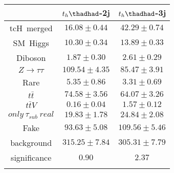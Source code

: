 \centering
\begin{tabular}{|ccc} \toprule\toprule
 & $t_{h}\thadhad$-2j & $t_{h}\thadhad$-3j\\\midrule
tcH~merged & $16.08\pm0.44$ & $42.29\pm0.74$\\
SM~Higgs & $10.30\pm0.34$ & $13.89\pm0.33$\\
Diboson & $1.87\pm0.30$ & $2.61\pm0.29$\\
$Z\to\tau\tau$ & $109.54\pm4.35$ & $85.47\pm3.91$\\
Rare & $5.35\pm0.86$ & $3.31\pm0.69$\\
$t\bar{t}$ & $74.58\pm3.56$ & $64.07\pm3.26$\\
$t\bar{t}V$ & $0.16\pm0.04$ & $1.57\pm0.12$\\
$only~\tau_{sub}~real$ & $19.83\pm1.78$ & $24.84\pm2.08$\\
Fake & $93.63\pm5.08$ & $109.56\pm5.46$\\
background & $315.25\pm7.84$ & $305.31\pm7.79$\\
significance & $0.90$ & $2.37$\\
\bottomrule\bottomrule\\
\end{tabular}
